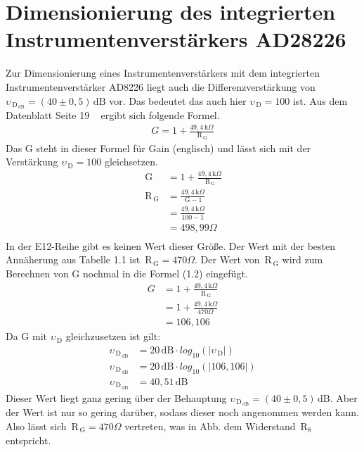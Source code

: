 \section{Dimensionierung des integrierten Instrumentenverstärkers AD28226}
Zur Dimensionierung eines Instrumentenverstärkers mit dem integrierten Instrumentenverstärker AD8226 liegt auch die Differenzverstärkung von $\upsilon_{\,\text{D}_{\,\text{dB}}}=(40\pm 0,5)\,\text{dB}$ vor. Das bedeutet das auch hier $\upsilon_{\,\text{D}} = 100$ ist. Aus dem Datenblatt Seite 19 ~\cite{datenblatt} ergibt sich folgende Formel.
\begin{align}
G = 1+\frac{49,4\,\text{k}\Omega}{\,\text{R}_{\,\text{G}}}
\end{align}
Das G steht in dieser Formel für Gain (englisch) und lässt sich mit der Verstärkung $\upsilon_{\,\text{D}} = 100$ gleichsetzen.
\begin{align*}
\,\text{G} & = 1+\frac{49,4\,\text{k}\Omega}{\,\text{R}_{\,\text{G}}}\\
\,\text{R}_{\,\text{G}} & = \frac{49,4\,\text{k}\Omega}{\,\text{G}-1}\\
                        & = \frac{49,4\,\text{k}\Omega}{100-1}\\
                        & = 498,99\Omega\\
\end{align*}
In der E12-Reihe gibt es keinen Wert dieser Größe. Der Wert mit der besten Annäherung aus Tabelle 1.1 ist $\,\text{R}_{\,\text{G}}=470\Omega$.
Der Wert von $\,\text{R}_{\,\text{G}}$ wird zum Berechnen von G nochmal in die Formel (1.2) eingefügt. 
\begin{align*} 
 G & = 1+\frac{49,4\,\text{k}\Omega}{\,\text{R}_{\,\text{G}}}\\
   & = 1+\frac{49,4\,\text{k}\Omega}{470\Omega}\\
   & = 106,106
 \end{align*}
Da G mit $\upsilon_{\,\text{D}}$ gleichzusetzen ist gilt:
\begin{align*}
\upsilon_{\,\text{D}_{\,\text{dB}}} & = 20\,\text{dB}\cdot log_{10}(|\upsilon_{\,\text{D}}|)\\
\upsilon_{\,\text{D}_{\,\text{dB}}} & = 20\,\text{dB}\cdot log_{10}(|106,106|)\\
\upsilon_{\,\text{D}_{\,\text{dB}}} & = 40,51\,\text{dB}
\end{align*}
Dieser Wert liegt ganz gering über der Behauptung $\upsilon_{\,\text{D}_{\,\text{dB}}}=(40\pm 0,5)\,\text{dB}$. Aber der Wert ist nur so gering darüber, sodass dieser noch angenommen werden kann. Also lässt sich $\,\text{R}_{\,\text{G}}=470\Omega$ vertreten, was in Abb. dem Widerstand $\,\text{R}_8$ entspricht.
